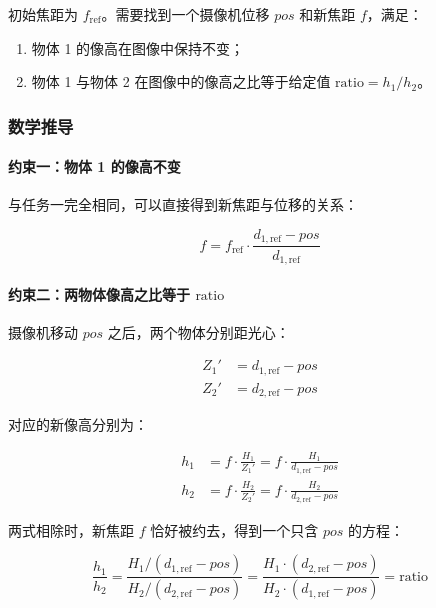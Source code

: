 \documentclass[12pt,a4paper]{ctexart}
\begin{document}
初始焦距为 $f_\text{ref}$。需要找到一个摄像机位移 $pos$ 和新焦距 $f$，满足：
\begin{enumerate}
  \item 物体 1 的像高在图像中保持不变；
  \item 物体 1 与物体 2 在图像中的像高之比等于给定值 $\text{ratio} = h_1 / h_2$。
\end{enumerate}

\subsubsection{数学推导}

\paragraph{约束一：物体 1 的像高不变}

与任务一完全相同，可以直接得到新焦距与位移的关系：

\begin{equation}
  f = f_\text{ref} \cdot \frac{d_{1,\text{ref}} - pos}{d_{1,\text{ref}}}
  \label{eq:f_from_pos}
\end{equation}

\paragraph{约束二：两物体像高之比等于 $\text{ratio}$}

摄像机移动 $pos$ 之后，两个物体分别距光心：

\begin{align}
  Z_1' &= d_{1,\text{ref}} - pos \\
  Z_2' &= d_{2,\text{ref}} - pos
\end{align}

对应的新像高分别为：

\begin{align}
  h_1 &= f \cdot \frac{H_1}{Z_1'} = f \cdot \frac{H_1}{d_{1,\text{ref}} - pos} \\
  h_2 &= f \cdot \frac{H_2}{Z_2'} = f \cdot \frac{H_2}{d_{2,\text{ref}} - pos}
\end{align}

两式相除时，新焦距 $f$ 恰好被约去，得到一个只含 $pos$ 的方程：

\begin{equation}
  \frac{h_1}{h_2} = \frac{H_1 / (d_{1,\text{ref}} - pos)}{H_2 / (d_{2,\text{ref}} - pos)} = \frac{H_1 \cdot (d_{2,\text{ref}} - pos)}{H_2 \cdot (d_{1,\text{ref}} - pos)} = \text{ratio}
  \label{eq:ratio_eq}
\end{equation}
\end{document}
